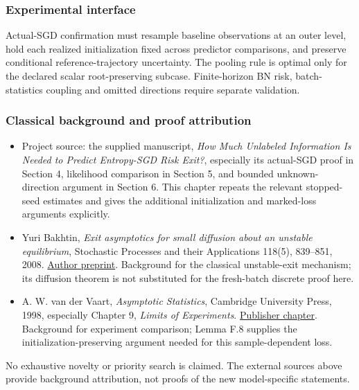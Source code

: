 \subsubsection{Experimental interface}\label{experimental-interface}

Actual-SGD confirmation must resample baseline observations at an outer
level, hold each realized initialization fixed across predictor
comparisons, and preserve conditional reference-trajectory uncertainty.
The pooling rule is optimal only for the declared scalar root-preserving
subcase. Finite-horizon BN risk, batch-statistics coupling and omitted
directions require separate validation.

\subsubsection{Classical background and proof
attribution}\label{classical-background-and-proof-attribution}

\begin{itemize}
\tightlist
\item
  Project source: the supplied manuscript, \emph{How Much Unlabeled
  Information Is Needed to Predict Entropy-SGD Risk Exit?}, especially
  its actual-SGD proof in Section 4, likelihood comparison in Section 5,
  and bounded unknown-direction argument in Section 6. This chapter
  repeats the relevant stopped-seed estimates and gives the additional
  initialization and marked-loss arguments explicitly.
\item
  Yuri Bakhtin, \emph{Exit asymptotics for small diffusion about an
  unstable equilibrium}, Stochastic Processes and their Applications
  118(5), 839--851, 2008.
  \href{https://arxiv.org/abs/math/0701569}{Author preprint}. Background
  for the classical unstable-exit mechanism; its diffusion theorem is
  not substituted for the fresh-batch discrete proof here.
\item
  A. W. van der Vaart, \emph{Asymptotic Statistics}, Cambridge
  University Press, 1998, especially Chapter 9, \emph{Limits of
  Experiments}.
  \href{https://www.cambridge.org/core/books/abs/asymptotic-statistics/limits-of-experiments/3DCF37272E376213D53F0CABB3EB9CC5}{Publisher
  chapter}. Background for experiment comparison; Lemma F.8 supplies the
  initialization-preserving argument needed for this sample-dependent
  loss.
\end{itemize}

No exhaustive novelty or priority search is claimed. The external
sources above provide background attribution, not proofs of the new
model-specific statements.
